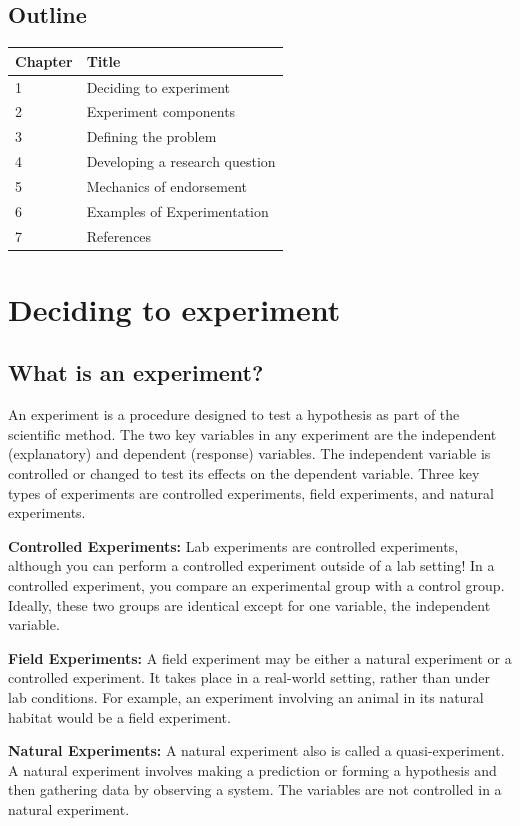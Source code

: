 \documentclass[openany]{book}
\begin{document}
\hypertarget{outline}{%
\section{Outline}\label{outline}}

\begin{longtable}[]{@{}ll@{}}
\toprule
Chapter & Title\tabularnewline
\midrule
\endhead
1 & Deciding to experiment\tabularnewline
2 & Experiment components\tabularnewline
3 & Defining the problem\tabularnewline
4 & Developing a research question\tabularnewline
5 & Mechanics of endorsement\tabularnewline
6 & Examples of Experimentation\tabularnewline
7 & References\tabularnewline
\bottomrule
\end{longtable}

\hypertarget{deciding-to-experiment}{%
\chapter{Deciding to experiment}\label{deciding-to-experiment}}

\hypertarget{what-is-an-experiment}{%
\section{What is an experiment?}\label{what-is-an-experiment}}

An experiment is a procedure designed to test a hypothesis as part of the scientific method.
The two key variables in any experiment are the independent (explanatory) and dependent (response) variables. The independent variable is controlled or changed to test its effects on the dependent variable. Three key types of experiments are controlled experiments, field experiments, and natural experiments.

\textbf{Controlled Experiments:} Lab experiments are controlled experiments, although you can perform a controlled experiment outside of a lab setting! In a controlled experiment, you compare an experimental group with a control group. Ideally, these two groups are identical except for one variable, the independent variable.

\textbf{Field Experiments:} A field experiment may be either a natural experiment or a controlled experiment. It takes place in a real-world setting, rather than under lab conditions. For example, an experiment involving an animal in its natural habitat would be a field experiment.

\textbf{Natural Experiments:} A natural experiment also is called a quasi-experiment. A natural experiment involves making a prediction or forming a hypothesis and then gathering data by observing a system. The variables are not controlled in a natural experiment.
\end{document}
